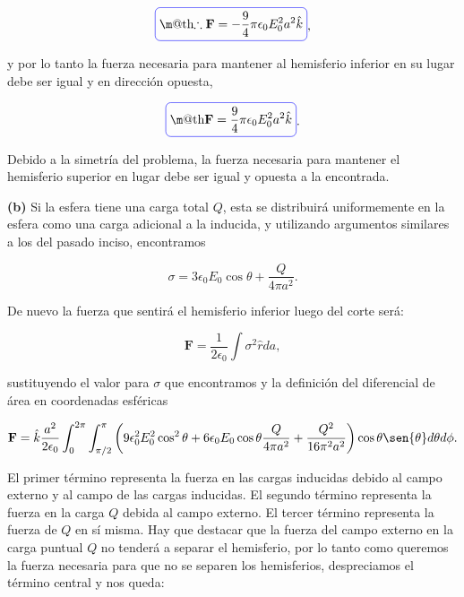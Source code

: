 \documentclass[a4paper,11pt]{article}
\makeatletter
\numberwithin{equation}{section}
\newcommand*{\boxcolor}{blue}
\renewcommand{\boxed}[1]{\textcolor{\boxcolor}{%
\tikz[baseline={([yshift=-1ex]current bounding box.center)}] \node [rectangle, minimum width=1ex,rounded corners,draw] {\normalcolor\m@th$\displaystyle#1$};}}
\makeatother
\begin{document}
\begin{equation}
 \boxed{\therefore \mathbf{F} = - \frac{9}{4}\pi\epsilon_0E_0^2a^2\hat{k}},
\end{equation}

y por lo tanto la fuerza necesaria para mantener al hemisferio inferior en su lugar 
debe ser igual y en dirección opuesta, 

\begin{equation}
 \boxed{\mathbf{F} = \frac{9}{4}\pi\epsilon_0E_0^2a^2\hat{k}}.
\end{equation}

Debido a la simetría del problema, la fuerza necesaria para mantener el hemisferio 
superior en lugar debe ser igual y opuesta a la encontrada.

\vspace{.3cm}

\textbf{(b)} Si la esfera tiene una carga total $Q$, esta se distribuirá uniformemente 
en la esfera como una carga adicional a la inducida, y utilizando argumentos similares 
a los del pasado inciso, encontramos 

\begin{equation}
 \sigma = 3\epsilon_0 E_0 \cos{\theta} + \frac{Q}{4\pi a^2}.
\end{equation}

De nuevo la fuerza que sentirá el hemisferio inferior luego del corte será:

\begin{equation}
 \mathbf{F} = \frac{1}{2\epsilon_0}\int \sigma^2 \hat{r} da,
\end{equation}

sustituyendo el valor para $\sigma$ que encontramos y la definición del diferencial 
de área en coordenadas esféricas

\begin{equation}
 \mathbf{F} = \hat{k} \frac{a^2}{2\epsilon_0}\int_0^{2\pi} \int_{\pi/2}^\pi
 \left(9\epsilon_0^2E_0^2 \cos^2{\theta} + 6\epsilon_0 E_0 \cos{\theta}
 \frac{Q}{4\pi a^2} + \frac{Q^2}{16\pi^2a^2}\right)\cos{\theta}\sen{\theta}
 d\theta d\phi.
\end{equation}

El primer término representa la fuerza en las cargas inducidas debido al campo 
externo y al campo de las cargas inducidas. El segundo término representa la fuerza 
en la carga $Q$ debida al campo externo. El tercer término representa la fuerza de 
$Q$ en sí misma. Hay que destacar que la fuerza del campo externo en la carga puntual
$Q$ no tenderá a separar el hemisferio, por lo tanto como queremos la fuerza necesaria 
para que no se separen los hemisferios, despreciamos el término central y nos queda:
\end{document}
